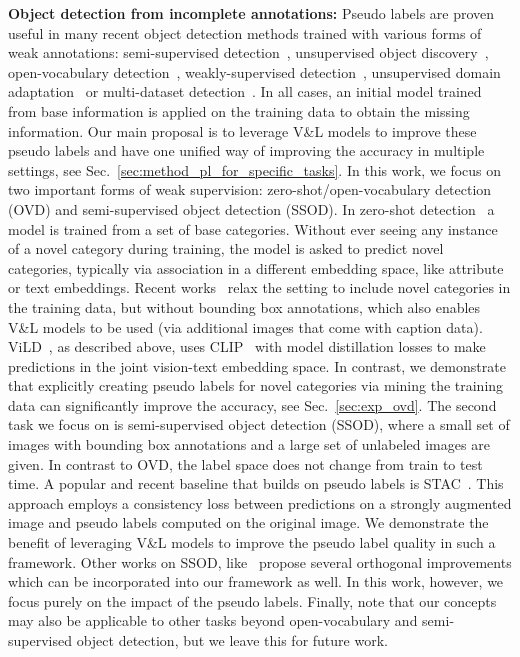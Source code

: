 \documentclass[runningheads]{llncs}
\begin{document}
\vspace{1mm}
\noindent \textbf{Object detection from incomplete annotations:}
Pseudo labels are proven useful in many recent object detection methods trained with various forms of weak annotations: semi-supervised detection~\cite{sohn2020detection,zhou_cvpr_21}, unsupervised object discovery~\cite{LOST}, open-vocabulary detection~\cite{gao2021open,zhong2021regionclip}, weakly-supervised detection~\cite{dong2021boosting,zhong2020boosting}, unsupervised domain adaptation~\cite{inoue_cvpr_18,yu_wacv_22} or multi-dataset detection~\cite{zhao_eccv_20}.  In all cases, an initial model trained from base information is applied on the training data to obtain the missing information.
Our main proposal is to leverage V\&L models to improve these pseudo labels and have one unified way of improving the accuracy in multiple settings, see Sec.~\ref{sec:method_pl_for_specific_tasks}.  In this work, we focus on two important forms of weak supervision: zero-shot/open-vocabulary detection (OVD) and semi-supervised object detection (SSOD).
In zero-shot detection~\cite{bansal2018zero} a model is trained from a set of base categories.  Without ever seeing any instance of a novel category during training, the model is asked to predict novel categories, typically via association in a different embedding space, like attribute or text embeddings.  Recent works~\cite{gu_iclr_22,rahman2020improved,zareian_cvpr_21} relax the setting to include novel categories in the training data, but without bounding box annotations, which also enables V\&L models to be used (via additional images that come with caption data).  ViLD~\cite{gu_iclr_22}, as described above, uses CLIP~\cite{radford_arxiv_2021} with model distillation losses to make predictions in the joint vision-text embedding space.  In contrast, we demonstrate that explicitly creating pseudo labels for novel categories via mining the training data can significantly improve the accuracy, see Sec.~\ref{sec:exp_ovd}.
The second task we focus on is semi-supervised object detection (SSOD), where a small set of images with bounding box annotations and a large set of unlabeled images are given.  In contrast to OVD, the label space does not change from train to test time.
A popular and recent baseline that builds on pseudo labels is STAC~\cite{sohn2020detection}.  This approach employs a consistency loss between predictions on a strongly augmented image and pseudo labels computed on the original image.  We demonstrate the benefit of leveraging V\&L models to improve the pseudo label quality in such a framework.  Other works on SSOD, like~\cite{xu_iccv2021_softteacher,zhou_cvpr_21} propose several orthogonal improvements which can be incorporated into our framework as well.  In this work, however, we focus purely on the impact of the pseudo labels.
Finally, note that our concepts may also be applicable to other tasks beyond open-vocabulary and semi-supervised object detection, but we leave this for future work.
\end{document}
